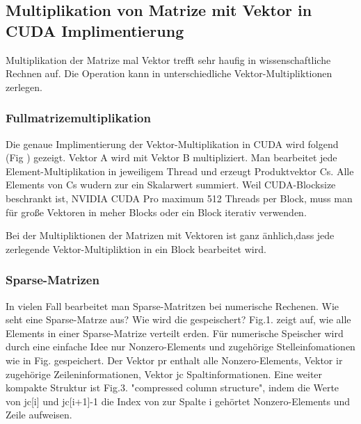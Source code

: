 



\subsection{Multiplikation von Matrize mit Vektor in CUDA Implimentierung}
Multiplikation der Matrize mal Vektor trefft sehr haufig in wissenschaftliche Rechnen auf. Die Operation kann in unterschiedliche Vektor-Multipliktionen zerlegen.

\subsubsection{Fullmatrizemultiplikation}

Die genaue Implimentierung der Vektor-Multiplikation in CUDA wird folgend (Fig ) 
gezeigt. Vektor A wird mit Vektor B multipliziert. 
Man bearbeitet jede Element-Multiplikation in jeweiligem Thread und erzeugt Produktvektor Cs.  
Alle Elements von Cs wudern zur ein Skalarwert summiert. 
Weil CUDA-Blocksize beschrankt ist, 
 NVIDIA CUDA Pro
maximum 512 Threads per Block, muss man für große Vektoren in meher Blocks oder ein Block iterativ verwenden.


Bei der Multipliktionen der Matrizen mit Vektoren ist ganz änhlich,dass jede zerlegende Vektor-Multipliktion in ein Block bearbeitet wird.




\subsubsection{Sparse-Matrizen}
In vielen Fall bearbeitet man Sparse-Matritzen bei numerische Rechenen. Wie seht eine Sparse-Matrze aus? Wie wird die gespeischert? Fig.1. zeigt auf, wie alle Elements in einer Sparse-Matrize verteilt erden. Für numerische Speischer wird durch eine einfache Idee nur Nonzero-Elements und zugehörige Stelleinfomationen wie in Fig. gespeichert. Der Vektor pr enthalt alle Nonzero-Elements, Vektor ir zugehörige Zeileninformationen, Vektor jc Spaltinformationen. Eine weiter kompakte Struktur ist Fig.3. "compressed column structure", indem die Werte von jc[i] und jc[i+1]-1 die Index von zur Spalte i gehörtet Nonzero-Elements und Zeile aufweisen.

